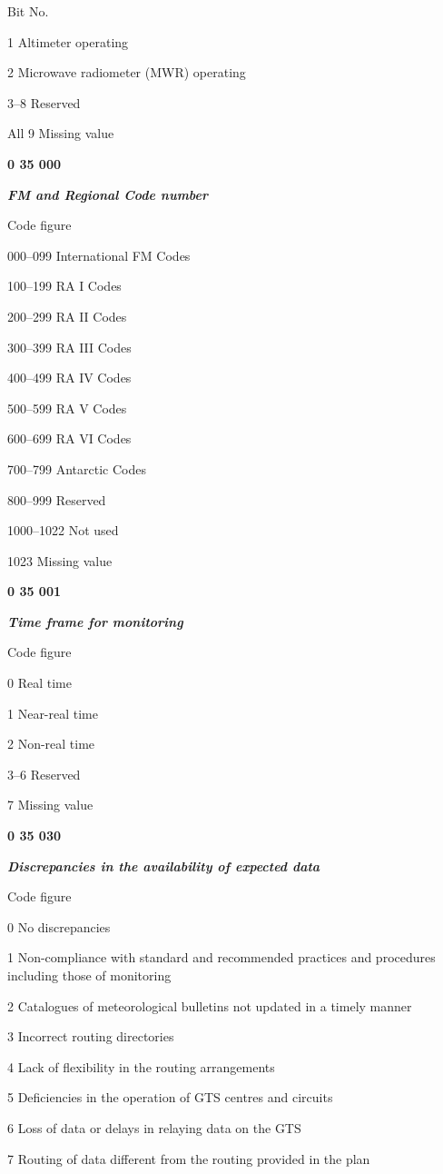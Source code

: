 Bit No.

1 Altimeter operating

2 Microwave radiometer (MWR) operating

3--8 Reserved

All 9 Missing value

\textbf{0 35 000}

\emph{\textbf{FM and Regional Code number}}

Code figure

000--099 International FM Codes

100--199 RA I Codes

200--299 RA II Codes

300--399 RA III Codes

400--499 RA IV Codes

500--599 RA V Codes

600--699 RA VI Codes

700--799 Antarctic Codes

800--999 Reserved

1000--1022 Not used

1023 Missing value

\textbf{0 35 001}

\emph{\textbf{Time frame for monitoring}}

Code figure

0 Real time

1 Near-real time

2 Non-real time

3--6 Reserved

7 Missing value

\textbf{0 35 030}

\emph{\textbf{Discrepancies in the availability of expected data}}

Code figure

0 No discrepancies

1 Non-compliance with standard and recommended practices and procedures including those of monitoring

2 Catalogues of meteorological bulletins not updated in a timely manner

3 Incorrect routing directories

4 Lack of flexibility in the routing arrangements

5 Deficiencies in the operation of GTS centres and circuits

6 Loss of data or delays in relaying data on the GTS

7 Routing of data different from the routing provided in the plan

